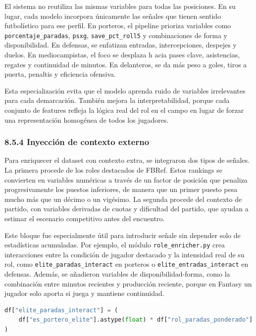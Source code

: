 El sistema no reutiliza las mismas variables para todas las posiciones. En su lugar, cada modelo incorpora únicamente las señales que tienen sentido 
futbolístico para ese perfil. En porteros, el pipeline prioriza variables como \texttt{porcentaje\_paradas}, \texttt{psxg}, \texttt{save\_pct\_roll5} 
y combinaciones de forma y disponibilidad. En defensas, se enfatizan entradas, intercepciones, despejes y duelos. En mediocampistas, el foco se desplaza h
acia pases clave, asistencias, regates y continuidad de minutos. En delanteros, se da más peso a goles, tiros a puerta, penaltis y eficiencia ofensiva.

Esta especialización evita que el modelo aprenda ruido de variables irrelevantes para cada demarcación. También mejora la interpretabilidad, 
porque cada conjunto de features refleja la lógica real del rol en el campo en lugar de forzar una representación homogénea de todos los jugadores.

\subsubsection{8.5.4 Inyección de contexto externo}

Para enriquecer el dataset con contexto extra, se integraron dos tipos de señales. La primera procede de los roles destacados de FBRef. Estos rankings 
se convierten en variables numéricas a través de un factor de posición que penaliza progresivamente los puestos inferiores, de manera que un primer puesto 
pesa mucho más que un décimo o un vigésimo. La segunda procede del contexto de partido, con variables derivadas de cuotas y dificultad del partido, que ayudan 
a estimar el escenario competitivo antes del encuentro.

Este bloque fue especialmente útil para introducir señale sin depender solo de estadísticas acumuladas. Por ejemplo, 
el módulo \texttt{role\_enricher.py} crea interacciones entre la condición de jugador destacado y la intensidad real de su rol, como \texttt{elite\_paradas\_interact} en 
porteros o \texttt{elite\_entradas\_interact} en defensas. Además, se añadieron variables de disponibilidad-forma, como la combinación entre minutos recientes y 
producción reciente, porque en Fantasy un jugador solo aporta si juega y mantiene continuidad.

\begin{lstlisting}[language=Python,caption={Inyección de interacciones entre elite y rol para enriquecer representación de características}]
df["elite_paradas_interact"] = (
    df["es_portero_elite"].astype(float) * df["rol_paradas_ponderado"]
)
\end{lstlisting}


